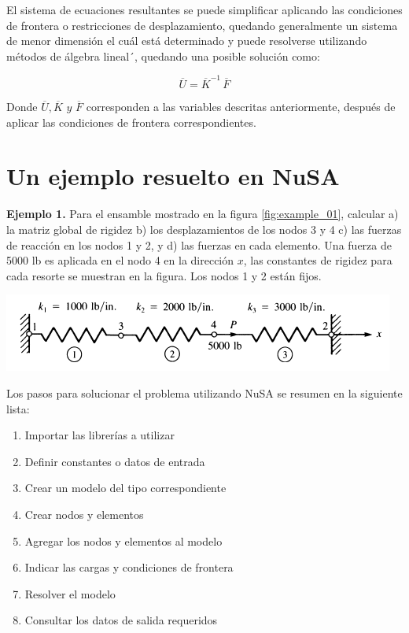 El sistema de ecuaciones resultantes se puede simplificar aplicando las condiciones 
de frontera o restricciones de desplazamiento, quedando generalmente un sistema 
de menor dimensión el cuál está determinado y puede resolverse utilizando métodos 
de álgebra lineal´, quedando una posible solución como:

\begin{equation}
\overline{U} = \overline{K}^{-1}\, \overline{F}
\end{equation}

Donde $\overline{U}, \overline{K} \,\, y \,\, \overline{F}$ corresponden a las variables descritas 
anteriormente, después de aplicar las condiciones de frontera correspondientes.


\section{Un ejemplo resuelto en NuSA}

\textbf{Ejemplo 1.} Para el ensamble mostrado en la figura \ref{fig:example_01}, calcular 
a) la matriz global de rigidez  b) los desplazamientos de los nodos 3 y 4  c) las fuerzas 
de reacción en los nodos 1 y 2, y  d) las fuerzas en cada elemento. Una fuerza de 5000 lb 
es aplicada en el nodo 4 en la dirección $x$, las constantes de rigidez para cada resorte 
se muestran en la figura. Los nodos 1 y 2 están fijos. ~\cite{logan2007}

\begin{center}
\includegraphics[scale=0.8]{src/spring-element/example_01.png}
\label{fig:example_01}
\end{center}


Los pasos para solucionar el problema utilizando NuSA se resumen en la siguiente 
lista:

\begin{enumerate}
\item Importar las librerías a utilizar
\item Definir constantes o datos de entrada 
\item Crear un modelo del tipo correspondiente
\item Crear nodos y elementos
\item Agregar los nodos y elementos al modelo
\item Indicar las cargas y condiciones de frontera 
\item Resolver el modelo
\item Consultar los datos de salida requeridos
\end{enumerate}

